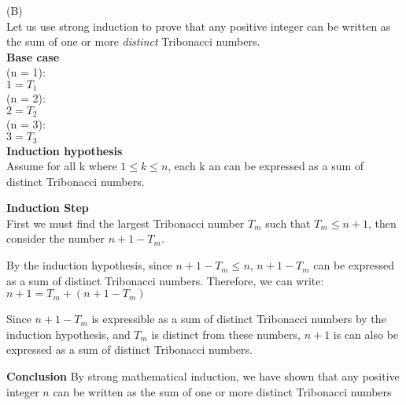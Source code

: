 \documentclass[solution,letterpaper]{cs20}
\begin{document}
\begin{problem}
\begin{solution}
        (B) \\
        Let us use strong induction to prove that any positive integer can be written as the sum of one or more \textit{distinct} Tribonacci numbers. \\

        \textbf{Base case} \\
        (n = 1): \\
        $1 = T_1$ \\

        (n = 2): \\
        $2 = T_2$ \\

        (n = 3): \\
        $3 = T_3$ \\

        \textbf{Induction hypothesis} \\
        Assume for all k where $1 \leq k \leq n$, each k an can be expressed as a sum of distinct Tribonacci numbers.

        \textbf{Induction Step} \\
        First we must find the largest Tribonacci number \( T_m \) such that \( T_m \leq n+1 \), then consider the number \( n+1 - T_m \).

        By the induction hypothesis, since \( n+1 - T_m \leq n \), \( n+1 - T_m \) can be expressed as a sum of distinct Tribonacci numbers. Therefore, we can write: $n+1 = T_m + (n+1 - T_m) $

        Since \( n+1 - T_m \) is expressible as a sum of distinct Tribonacci numbers by the induction hypothesis, and \( T_m \) is distinct from these numbers, \( n+1 \) is can also be expressed as a sum of distinct Tribonacci numbers.

        \textbf{Conclusion}
        By strong mathematical induction, we have shown that any positive integer \( n \) can be written as the sum of one or more distinct Tribonacci numbers \qedsymbol


        \end{solution}
    \end{problem}
\end{document}
